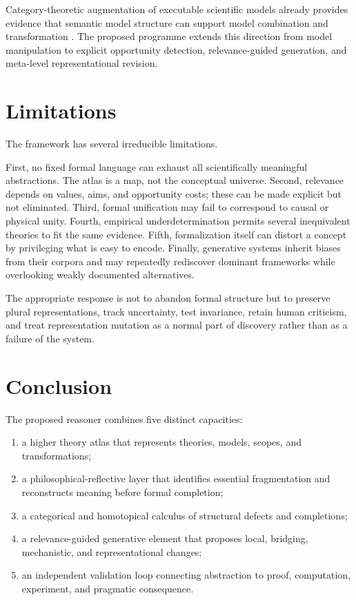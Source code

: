 \documentclass[11pt]{article}
\begin{document}
Category-theoretic augmentation of executable scientific models already provides evidence that
semantic model structure can support model combination and transformation \cite{halter2020}. The
proposed programme extends this direction from model manipulation to explicit opportunity detection,
relevance-guided generation, and meta-level representational revision.

\section{Limitations}

The framework has several irreducible limitations.

First, no fixed formal language can exhaust all scientifically meaningful abstractions. The atlas is a
map, not the conceptual universe. Second, relevance depends on values, aims, and opportunity costs;
these can be made explicit but not eliminated. Third, formal unification may fail to correspond to
causal or physical unity. Fourth, empirical underdetermination permits several inequivalent theories to
fit the same evidence. Fifth, formalization itself can distort a concept by privileging what is easy to
encode. Finally, generative systems inherit biases from their corpora and may repeatedly rediscover
dominant frameworks while overlooking weakly documented alternatives.

The appropriate response is not to abandon formal structure but to preserve plural representations,
track uncertainty, test invariance, retain human criticism, and treat representation mutation as a
normal part of discovery rather than as a failure of the system.

\section{Conclusion}

The proposed reasoner combines five distinct capacities:
\begin{enumerate}
  \item a higher theory atlas that represents theories, models, scopes, and transformations;
  \item a philosophical-reflective layer that identifies essential fragmentation and reconstructs
  meaning before formal completion;
  \item a categorical and homotopical calculus of structural defects and completions;
  \item a relevance-guided generative element that proposes local, bridging, mechanistic, and
  representational changes;
  \item an independent validation loop connecting abstraction to proof, computation, experiment, and
  pragmatic consequence.
\end{enumerate}
\end{document}
